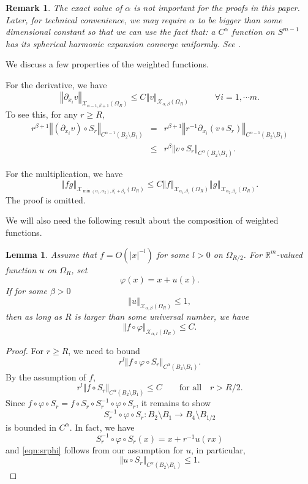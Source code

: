 \documentclass{amsart}
\newtheorem{lem}[thm]{Lemma}
\newtheorem{rem}[thm]{Remark}
\newcommand{\norm}[1]{\left\Vert#1\right\Vert}
\newcommand{\abs}[1]{\left\vert#1\right\vert}
\newcommand{\Real}{\mathbb R}
\numberwithin{equation}{section}
\begin{document}
\begin{rem}
	\label{rem:kalf}
	The exact value of $\alpha$ is not important for the proofs in this paper. Later, for technical convenience, we may require $\alpha$ to be bigger than some dimensional constant so that we can use the fact that: a $C^\alpha$ function on $S^{m-1}$ has its spherical harmonic expansion converge uniformly. See \cite{kalf1995}.
\end{rem}

We discuss a few properties of the weighted functions.

For the derivative, we have
\begin{equation}
	\label{eqn:partial}
	\norm{\partial_{x_i} v}_{\mathcal X_{\alpha-1,\beta+1}(\Omega_R)}\leq C \norm{v}_{\mathcal X_{\alpha,\beta}(\Omega_R)} \qquad \text{} \quad \forall i=1,\cdots m.
\end{equation}
To see this, for any $r\geq R$,
\begin{eqnarray*}
	r^{\beta+1} \norm{(\partial_{x_i} v)\circ S_r}_{C^{\alpha-1}(B_2\setminus B_1)} &=& r^{\beta+1} \norm{ r^{-1} \partial_{x_i}(v\circ S_r)}_{C^{\alpha-1}(B_2\setminus B_1)} \\
											&\leq& r^{\beta} \norm{ v\circ S_r}_{C^\alpha(B_2\setminus B_1)}.
\end{eqnarray*}

For the multiplication, we have
\begin{equation}
	\label{eqn:multi}
	\norm{fg}_{\mathcal X_{\min(\alpha_1,\alpha_2),\beta_1+\beta_2}(\Omega_R)} \leq C \norm{f}_{\mathcal X_{\alpha_1,\beta_1}(\Omega_R)} \norm{g}_{\mathcal X_{\alpha_2,\beta_2}(\Omega_R)}.
\end{equation}
The proof is omitted.


We will also need the following result about the composition of weighted functions.
\begin{lem}
	\label{lem:composit}
	Assume that $f=O(\abs{x}^{-l})$ for some $l>0$ on $\Omega_{R/2}$. For $\Real^m$-valued function $u$ on $\Omega_R$, set
	\[
		\varphi(x)=x+u(x).
	\]
	If for some $\beta>0$
	\[
		\norm{u}_{\mathcal X_{\alpha,\beta}(\Omega_R)}\leq 1,
	\]
	then as long as $R$ is larger than some universal number, we have
	\[
		\norm{f\circ \varphi}_{\mathcal X_{\alpha,l}(\Omega_{R})}\leq C.
	\]
\end{lem}
\begin{proof}
	For $r\geq R$, we need to bound
	\[
		r^l \norm{f\circ \varphi \circ S_r}_{C^\alpha(B_2\setminus B_1)}.
	\]
	By the assumption of $f$,
	\[
		r^l \norm{f\circ S_r}_{C^\alpha(B_2\setminus B_1)}\leq C \qquad \text{for all} \quad r>R/2.
	\]
	Since $f\circ \varphi\circ S_r = f\circ S_r \circ S_r^{-1}\circ \varphi \circ S_r$, it remains to show
	\begin{equation}
		\label{eqn:srphi}
		S_r^{-1}\circ \varphi\circ S_r: B_2\setminus B_1 \to B_{4}\setminus B_{1/2}
	\end{equation}
	is bounded in $C^\alpha$. In fact, we have
	\[
		S_r^{-1}\circ \varphi \circ S_r (x)= x+ r^{-1} u(r x)
	\]
	and \eqref{eqn:srphi} follows from our assumption for $u$, in particular,
	\[
		\norm{u\circ S_r}_{C^\alpha(B_2\setminus B_1)}\leq 1.
	\]
\end{proof}
\end{document}
